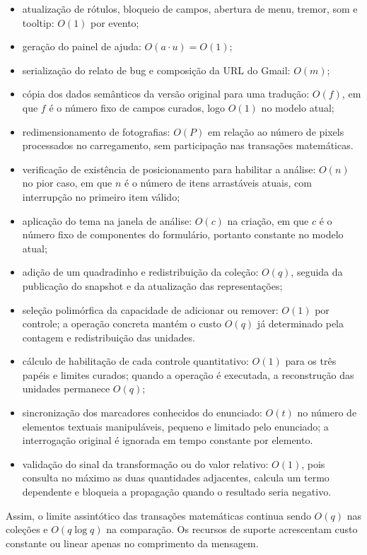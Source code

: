 \documentclass[12pt,a4paper]{article}
\begin{document}
\begin{itemize}[noitemsep]
  \item atualização de rótulos, bloqueio de campos, abertura de menu, tremor, som e tooltip: $O(1)$ por evento;
  \item geração do painel de ajuda: $O(a\cdot u)=O(1)$;
  \item serialização do relato de bug e composição da URL do Gmail: $O(m)$;
  \item cópia dos dados semânticos da versão original para uma tradução: $O(f)$, em que $f$ é o número fixo de campos curados, logo $O(1)$ no modelo atual;
  \item redimensionamento de fotografias: $O(P)$ em relação ao número de pixels processados no carregamento, sem participação nas transações matemáticas.
  \item verificação de existência de posicionamento para habilitar a análise: $O(n)$ no pior caso, em que $n$ é o número de itens arrastáveis atuais, com interrupção no primeiro item válido;
  \item aplicação do tema na janela de análise: $O(c)$ na criação, em que $c$ é o número fixo de componentes do formulário, portanto constante no modelo atual;
  \item adição de um quadradinho e redistribuição da coleção: $O(q)$, seguida da publicação do snapshot e da atualização das representações;
  \item seleção polimórfica da capacidade de adicionar ou remover: $O(1)$ por controle; a operação concreta mantém o custo $O(q)$ já determinado pela contagem e redistribuição das unidades.
  \item cálculo de habilitação de cada controle quantitativo: $O(1)$ para os três papéis e limites curados; quando a operação é executada, a reconstrução das unidades permanece $O(q)$;
  \item sincronização dos marcadores conhecidos do enunciado: $O(t)$ no número de elementos textuais manipuláveis, pequeno e limitado pelo enunciado; a interrogação original é ignorada em tempo constante por elemento.
  \item validação do sinal da transformação ou do valor relativo: $O(1)$, pois consulta no máximo as duas quantidades adjacentes, calcula um termo dependente e bloqueia a propagação quando o resultado seria negativo.
\end{itemize}

Assim, o limite assintótico das transações matemáticas continua sendo $O(q)$ nas coleções e $O(q\log q)$ na comparação. Os recursos de suporte acrescentam custo constante ou linear apenas no comprimento da mensagem.
\end{document}
